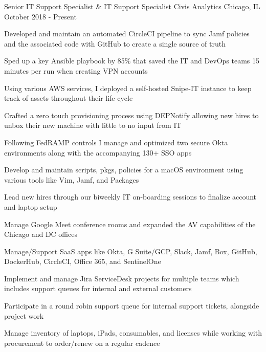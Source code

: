 

\begin{cventries}

	\cventry
	{Senior IT Support Specialist \& IT Support Specialist} %
	{Civis Analytics} %
	{Chicago, IL} %
	{October 2018 - Present} %
	{
		\begin{cvitems} %
			\item {Developed and maintain an automated CircleCI pipeline to sync Jamf policies and the associated code with GitHub to create a single source of truth}
			\item {Sped up a key Ansible playbook by 85\% that saved the IT and DevOps teams 15 minutes per run when creating VPN accounts}
			\item {Using various AWS services, I deployed a self-hosted Snipe-IT instance to keep track of assets throughout their life-cycle}
			\item {Crafted a zero touch provisioning process using DEPNotify allowing new hires to unbox their new machine with little to no input from IT}
			\item {Following FedRAMP controls I manage and optimized two secure Okta environments along with the accompanying 130+ SSO apps}
			\item {Develop and maintain scripts, pkgs, policies for a macOS environment using various tools like Vim, Jamf, and Packages}
			\item {Lead new hires through our biweekly IT on-boarding sessions to finalize account and laptop setup}
			\item {Manage Google Meet conference rooms and expanded the AV capabilities of the Chicago and DC offices}
			\item {Manage/Support SaaS apps like Okta, G Suite/GCP, Slack, Jamf, Box, GitHub, DockerHub, CircleCI, Office 365, and SentinelOne}
			\item {Implement and manage Jira ServiceDesk projects for multiple teams which includes support queues for internal and external customers}
			\item {Participate in a round robin support queue for internal support tickets, alongside project work}
			\item {Manage inventory of laptops, iPads, consumables, and licenses while working with procurement to order/renew on a regular cadence}
		\end{cvitems}
	}


\end{cventries}
